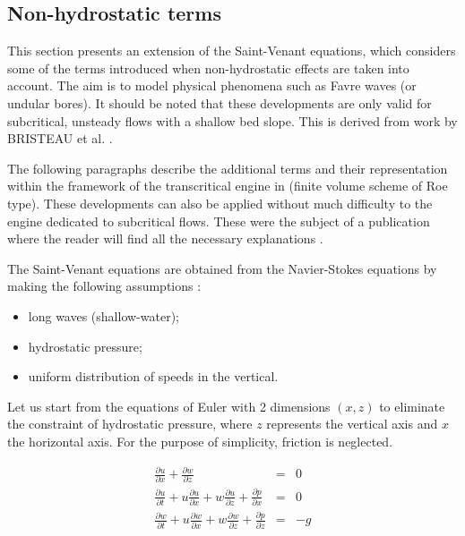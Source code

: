\subsection{Non-hydrostatic terms}

This section presents an extension of the Saint-Venant equations, which considers some of the terms introduced when non-hydrostatic effects are taken into account. The aim is to model physical phenomena such as Favre waves (or undular bores). It should be noted that these developments are only valid for subcritical, unsteady flows with a shallow bed slope. This is derived from work by BRISTEAU et al. \cite{BRISTEAU11}.

The following paragraphs describe the additional terms and their representation within the framework of the transcritical engine in \mascaret{} (finite volume scheme of Roe type). These developments can also be applied without much difficulty to the \REZO{} engine dedicated to subcritical flows. These were the subject of a publication where the reader will find all the necessary explanations \cite{BRISTEAU11}.

The Saint-Venant equations are obtained from the Navier-Stokes equations by making the following assumptions :
\begin{itemize}
  \item long waves (shallow-water);
  \item hydrostatic pressure;
  \item uniform distribution of speeds in the vertical.
\end{itemize}

Let us start from the equations of Euler with 2 dimensions $(x,z)$ to eliminate the constraint of hydrostatic pressure, where $z$ represents the vertical axis and $x$ the horizontal axis. For the purpose of simplicity, friction is neglected.

\begin{eqnarray}
\frac{\partial u}{\partial x} + \frac{\partial w}{\partial z} & = & 0 \label{eq:NS_2d1}\\
\frac{\partial u}{\partial t} + u \frac{\partial u}{\partial x} + w \frac{\partial u}{\partial z} + \frac{\partial p}{\partial x} & = & 0 \label{eq:NS_2d2}\\
\frac{\partial w}{\partial t} + u\frac{\partial w}{\partial x} + w\frac{\partial w}{\partial z} + \frac{\partial p}{\partial z} & = & -g \label{eq:NS_2d3}
\end{eqnarray}

